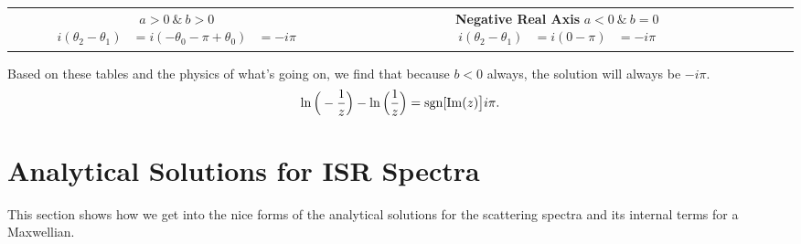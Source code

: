 \begin{table}[H]
\begin{tabular}{c|c|c|c}
{			$a>0\ \&\ b > 0$ \\
			$\begin{aligned}
				i(\theta_2-\theta_1)
				&= i(-\theta_0-\pi+\theta_0)\\
				&= -i\pi 
			\end{aligned} $} 
		&
		\makecell[t]{\textbf{Negative Real Axis}\\
			$a< 0\ \&\ b = 0$ \\
			$\begin{aligned}
				i(\theta_2-\theta_1) 
				&= i(0-\pi) \\
				&= -i \pi
			\end{aligned}$}
	\end{tabular}
\end{table}

Based on these tables and the physics of what's going on, 
we find that because $b<0$ always, the solution will always be
$-i\pi$.
%
\begin{equation}
	\ln\Big(-\frac{1}{z}\Big) - \ln\Big(\frac{1}{z}\Big) = \operatorname{sgn}[\operatorname{Im}(z)\big] i \pi.
\end{equation}



\section{Analytical Solutions for ISR Spectra}
\label{a:spectra}
This section shows how we get into the nice forms of the analytical solutions for the scattering spectra
and its internal terms for a Maxwellian.

